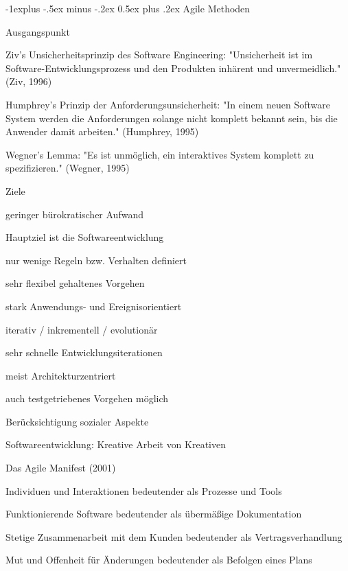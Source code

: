 \documentclass[a4paper]{article}
\makeatletter
\renewcommand{\subsection}{\@startsection{subsection}{2}{0mm}%
                                {-1explus -.5ex minus -.2ex}%
                                {0.5ex plus .2ex}%
                                {\normalfont\normalsize\bfseries}}
\makeatother
\begin{document}
\begin{multicols}{3}
  \subsection{Agile Methoden}
  \begin{itemize*}
    \item Ausgangspunkt
    \begin{itemize*}
      \item Ziv's Unsicherheitsprinzip des Software Engineering:  "Unsicherheit ist im Software-Entwicklungsprozess und den Produkten inhärent und unvermeidlich." (Ziv, 1996)
      \item Humphrey's Prinzip der Anforderungsunsicherheit: "In einem neuen Software System werden die Anforderungen solange nicht komplett bekannt sein, bis die Anwender damit arbeiten." (Humphrey, 1995)
      \item Wegner's Lemma: "Es ist unmöglich, ein interaktives System komplett zu spezifizieren." (Wegner, 1995)
    \end{itemize*}
    \item Ziele
    \begin{itemize*}
      \item geringer bürokratischer Aufwand
      \item Hauptziel ist die Softwareentwicklung
      \item nur wenige Regeln bzw. Verhalten definiert
      \item sehr flexibel gehaltenes Vorgehen
      \item stark Anwendungs- und Ereignisorientiert
      \item iterativ / inkrementell / evolutionär
      \item sehr schnelle Entwicklungsiterationen
      \item meist Architekturzentriert
      \item auch testgetriebenes Vorgehen möglich
      \item Berücksichtigung sozialer Aspekte
      \item Softwareentwicklung: Kreative Arbeit von Kreativen
    \end{itemize*}
  \end{itemize*}

  Das Agile Manifest (2001)
  \begin{itemize*}
    \item Individuen und Interaktionen bedeutender als Prozesse und Tools
    \item Funktionierende Software bedeutender als übermäßige Dokumentation
    \item Stetige Zusammenarbeit mit dem Kunden bedeutender als Vertragsverhandlung
    \item Mut und Offenheit für Änderungen bedeutender als Befolgen eines Plans
  \end{itemize*}


\end{multicols}
\end{document}
